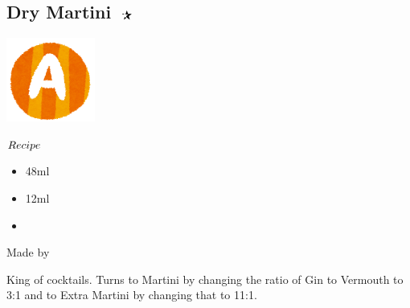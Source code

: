 \subsection{Dry Martini $\openbigstar$}
\vspace{-7mm}
\hspace{42mm}
\includegraphics[scale=.12]{capital_a.png}
\vspace{2.5mm}
\begin{itembox}[l]{\boldmath $Recipe$}
\begin{itemize}
\setlength{\parskip}{0cm}
\setlength{\itemsep}{0cm}
\item \gin 48ml
\item \vermouth 12ml
\item {}
\end{itemize}
\vspace{-4mm}
Made by \stir
\end{itembox}
King of cocktails.
Turns to Martini by changing the ratio of Gin to Vermouth to 3:1 and to Extra Martini by changing that to 11:1.
